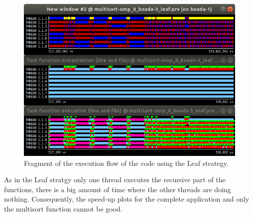 \documentclass[12pt, a4paper]{article}
\begin{document}
\begin{figure}[H]
	\centering
	\includegraphics[scale=0.45]{./images/S2/Leaf_paraver}
	
	\label{fig:leaf_traces}
	\caption{Fragment of the execution flow of the code using the Leaf strategy.}
\end{figure}

As in the Leaf stratgy only one thread executes the recursive part of the functions, there is a big amount of time where the other threads are doing nothing. Consequently, the speed-up plots for the complete application and only the multisort function cannot be good.
\end{document}
